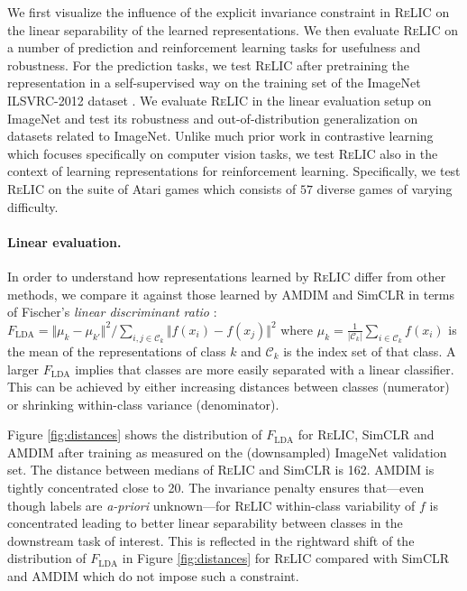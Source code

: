 \documentclass{article}
\newcommand{\feat}{f}
\newcommand{\relic}{\textsc{ReLIC}}
\begin{document}
We first visualize the influence of the explicit invariance constraint in \relic{} on the linear separability of the learned representations.
We then evaluate \relic{} on a number of prediction and reinforcement learning tasks for usefulness and robustness. 
For the prediction tasks, we test \relic{} after pretraining the representation in a self-supervised way on the training set of the ImageNet ILSVRC-2012 dataset \citep{Russakovsky2015ImageNetLS}.
We evaluate \relic{} in the linear evaluation setup on ImageNet and test its robustness and out-of-distribution generalization on datasets related to ImageNet. 
Unlike much prior work in contrastive learning which focuses specifically on computer vision tasks, we test \relic{} also in the context of learning representations for reinforcement learning. 
Specifically, we test \relic{} on the suite of Atari games \citep{Bellemare2013TheAL} which consists of $57$ diverse games of varying difficulty.

\paragraph{Linear evaluation.} 
In order to understand how representations learned by \relic{} differ from other methods, we compare it against those learned by AMDIM and SimCLR in terms of Fischer's \emph{linear discriminant ratio} \citep{friedman2001elements}:
$
F_{\text{LDA}} = \Vert \mu_k - \mu_{k'}\Vert^2/\sum_{i,j\in \mathcal{C}_k} \Vert\feat(x_i) - \feat(x_j)\Vert^2 
\label{eq:lda}
$
where $\mu_k = \frac{1}{|\mathcal{C}_k|} \sum_{i\in \mathcal{C}_k} \feat(x_i)$ is the mean of the representations of class $k$ and $ \mathcal{C}_k$ is the index set of that class. 
A larger $F_{\text{LDA}}$ implies that classes are more easily separated with a linear classifier. This can be achieved by either increasing distances between classes (numerator) or shrinking within-class variance (denominator).

Figure \ref{fig:distances} shows the distribution of $F_{\text{LDA}}$ for \relic{}, SimCLR and AMDIM after training as measured on the (downsampled) ImageNet validation set. The distance between medians of \relic{} and SimCLR is 162. AMDIM is tightly concentrated close to 20. 
The invariance penalty ensures that---even though labels are \emph{a-priori} unknown---for \relic{} within-class variability of $\feat$ is concentrated leading to better linear separability between classes in the downstream task of interest.
This is reflected in the rightward shift of the distribution of $F_{\text{LDA}}$ in Figure \ref{fig:distances} for \relic{} compared with SimCLR and AMDIM which do not impose such a constraint. 
\end{document}
